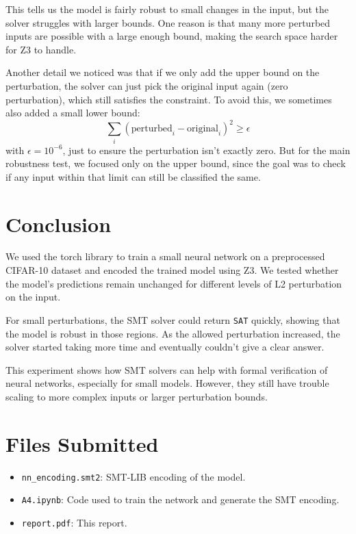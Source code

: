 \documentclass{article}
\begin{document}
This tells us the model is fairly robust to small changes in the input, but the solver struggles with larger bounds. One reason is that many more perturbed inputs are possible with a large enough bound, making the search space harder for Z3 to handle.

Another detail we noticed was that if we only add the upper bound on the perturbation, the solver can just pick the original input again (zero perturbation), which still satisfies the constraint. To avoid this, we sometimes also added a small lower bound:
\[
\sum_i (\text{perturbed}_i - \text{original}_i)^2 \geq \epsilon
\]
with $\epsilon = 10^{-6}$, just to ensure the perturbation isn’t exactly zero. But for the main robustness test, we focused only on the upper bound, since the goal was to check if any input within that limit can still be classified the same.

\section{Conclusion}
We used the torch library to train a small neural network on a preprocessed CIFAR-10 dataset and encoded the trained model using Z3. We tested whether the model’s predictions remain unchanged for different levels of L2 perturbation on the input.

For small perturbations, the SMT solver could return \texttt{SAT} quickly, showing that the model is robust in those regions. As the allowed perturbation increased, the solver started taking more time and eventually couldn’t give a clear answer.

This experiment shows how SMT solvers can help with formal verification of neural networks, especially for small models. However, they still have trouble scaling to more complex inputs or larger perturbation bounds.

\section*{Files Submitted}
\begin{itemize}
    \item \texttt{nn\_encoding.smt2}: SMT-LIB encoding of the model.
    \item \texttt{A4.ipynb}: Code used to train the network and generate the SMT encoding.
    \item \texttt{report.pdf}: This report.
\end{itemize}
\end{document}
